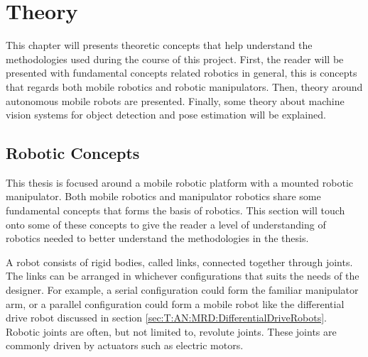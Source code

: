 \chapter{Theory}
This chapter will presents theoretic concepts that help understand the methodologies used during the course of this project. First, the reader will be presented with fundamental concepts related robotics in general, this is concepts that regards both mobile robotics and robotic manipulators. Then, theory around autonomous mobile robots are presented. Finally, some theory about machine vision systems for object detection and pose estimation will be explained. 


\section{Robotic Concepts}
This thesis is focused around a mobile robotic platform with a mounted robotic manipulator. Both mobile robotics and manipulator robotics share some fundamental concepts that forms the basis of robotics. This section will touch onto some of these concepts to give the reader a level of understanding of robotics needed to better understand the methodologies in the thesis. 

A robot consists of rigid bodies, called links, connected together through joints. The links can be arranged in whichever configurations that suits the needs of the designer. For example, a serial configuration could form the familiar manipulator arm, or a parallel configuration could form a mobile robot like the differential drive robot discussed in section \ref{sec:T:AN:MRD:DifferentialDriveRobots}. Robotic joints are often, but not limited to, revolute joints. These joints are commonly driven by actuators such as electric motors.

